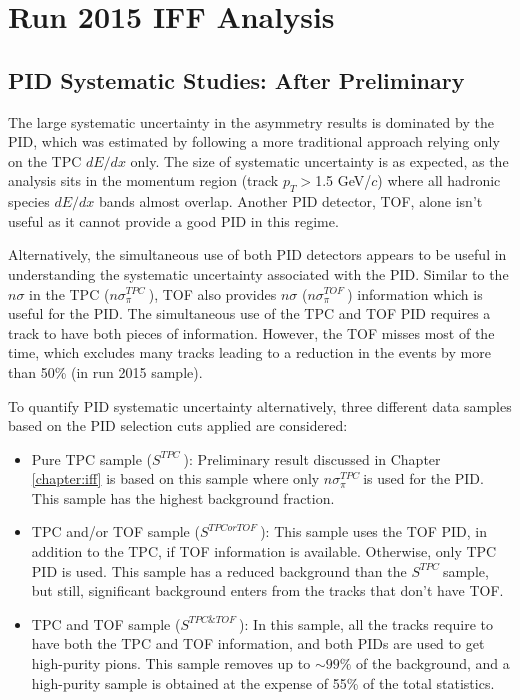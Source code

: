
\chapter{Run 2015 IFF Analysis}

\newcommand{\sigmatpc}{$n\sigma_\pi^{TPC}\ $}
\newcommand{\sigmatof}{$n\sigma_\pi^{TOF}\ $}
\newcommand{\tpcortof}{$S^{TPCorTOF}\ $}
\newcommand{\tpconly}{$S^{TPC}\ $}
\newcommand{\tpcntof}{$S^{TPC\&TOF}\ $}

\section{PID Systematic Studies: After Preliminary}
The large systematic uncertainty in the asymmetry results is dominated by the PID, which was estimated by following a more traditional approach relying only on the TPC $dE/dx$ only. The size of systematic uncertainty is as expected, as the analysis sits in the momentum region (track $p_T>$1.5 GeV/$c$) where all hadronic species $dE/dx$ bands almost overlap. Another PID detector, TOF, alone isn't useful as it cannot provide a good PID in this regime. 

Alternatively, the simultaneous use of both PID detectors appears to be useful in understanding the systematic uncertainty associated with the PID. Similar to the $n\sigma$ in the TPC (\sigmatpc), TOF also provides $n\sigma$ (\sigmatof) information which is useful for the PID. The simultaneous use of the TPC and TOF PID requires a track to have both pieces of information. However, the TOF misses most of the time, which excludes many tracks leading to a reduction in the \dipion events by more than 50\% (in run 2015 sample). 

To quantify PID systematic uncertainty alternatively, three different data samples based on the PID selection cuts applied are considered:
\begin{itemize}
    \item Pure TPC sample (\tpconly): Preliminary result discussed in Chapter \ref{chapter:iff} is based on this sample where only \sigmatpc is used for the PID. This sample has the highest background fraction. 
    \item TPC and/or TOF sample (\tpcortof):  This sample uses the TOF PID, in addition to the TPC, if TOF information is available. Otherwise, only TPC PID is used. This sample has a reduced background than the \tpconly sample, but still, significant background enters from the tracks that don't have TOF. 
    \item TPC and TOF sample (\tpcntof): In this sample, all the tracks require to have both the TPC and TOF information, and both PIDs are used to get high-purity pions. This sample removes up to $\sim 99 \%$ of the background, and a high-purity sample is obtained at the expense of 55\% of the total statistics. 
\end{itemize}

